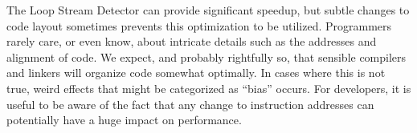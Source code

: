 \documentclass[a4paper,10pt,twocolumn,twoside]{article}
\begin{document}
The Loop Stream Detector can provide significant speedup, but subtle changes to code layout sometimes prevents this optimization to be utilized. 
Programmers rarely care, or even know, about intricate details such as the addresses and alignment of code. 
We expect, and probably rightfully so, that sensible compilers and linkers will organize code somewhat optimally. 
In cases where this is not true, weird effects that might be categorized as “bias” occurs. 
For developers, it is useful to be aware of the fact that any change to instruction addresses can potentially have a huge impact on performance.





\end{document}
